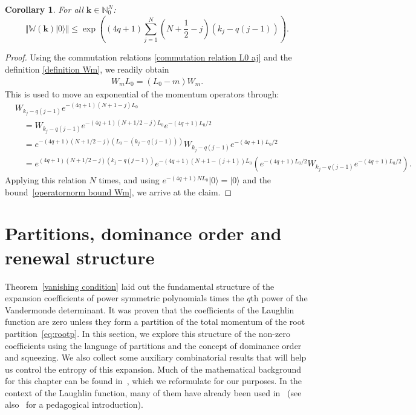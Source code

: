 \documentclass[letterpaper, DIV=17]{scrartcl}
\newtheorem{cor}[theorem]{Corollary}
\numberwithin{equation}{section}
\theoremstyle{definition}
\begin{document}
		
				
		\begin{cor}\label{cor:keyest}
			For all $ \mathbf{k} \in \mathbb{N}_0^N $:
			\begin{equation} \label{key estimate}
					\Vert   \mathbb{W}(\mathbf{k})  \vert 0 \rangle \Vert \leq \exp\left((4q+1)  \sum_{j=1}^N (N+\frac{1}{2}-j)(k_j -q(j-1))  \right)  . 
			\end{equation}
		\end{cor} 
		\begin{proof}
		
		
		Using the commutation relations \eqref{commutation relation L0 aj} and the definition \eqref{definition Wm}, we readily obtain
		\begin{align*}
			W_m L_0 = (L_0-m) W_m .
		\end{align*}
		This is used to move an exponential of the momentum operators through:
		\begin{align*}
			&W_{k_j-q(j-1)} e^{-(4q+1) (N+1-j) L_0} \\
			&\quad= W_{k_j-q(j-1)} e^{-(4q+1) (N+1/2-j) L_0}  e^{-(4q+1) L_0/2} \\
			&\quad= e^{-(4q+1) (N+1/2-j) (L_0-(k_j-q(j-1)))} W_{k_j-q(j-1)} e^{-(4q+1) L_0/2} \\
			&\quad= e^{(4q+1) (N+1/2-j)(k_j-q(j-1))} e^{-(4q+1) (N+1-(j+1)) L_0} \left(e^{-(4q+1) L_0/2} W_{k_j-q(j-1)} e^{-(4q+1) L_0/2} \right).
		\end{align*}
		Applying this relation $N$ times, and using $e^{-(4q+1)N L_0} \vert 0 \rangle = \vert 0 \rangle$ and the bound~\eqref{operatornorm bound Wm}, we arrive at the claim. 
		\end{proof}
		
\section{Partitions, dominance order and renewal structure}\label{sec:partitions}
%
	Theorem~\ref{vanishing condition} laid out the fundamental structure of the expansion coefficients of power symmetric polynomials times the $q$th power of the Vandermonde determinant. It was proven that the coefficients of the Laughlin function are zero unless they form a partition of the total momentum of the root partition~\eqref{eq:rootp}. In this section, we explore this structure of the non-zero coefficients using the language of partitions and the concept of dominance order and squeezing. 
We also collect some auxiliary combinatorial results that will help us control the entropy of this expansion. Much of the mathematical background for this chapter can be found in~\cite{macdonald1995symmetric, stanley1989some}, which we reformulate for our purposes. In the context of the Laughlin function, many of them have already been used in~\cite{jansen2009symmetry} (see also~\cite{DiGioacchinoMasterthesis} for a pedagogical introduction).
	
\end{document}
